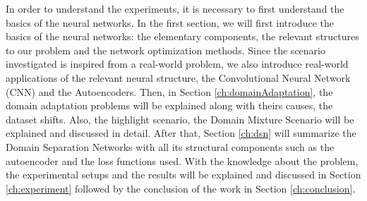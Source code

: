 In order to understand the experiments, it is necessary to first understand the basics of the neural networks. In the first section, we will first introduce the basics of the neural networks: the elementary components, the relevant structures to our problem and the network optimization methods. Since the scenario investigated is inspired from a real-world problem, we also introduce real-world applications of the relevant neural structure, the Convolutional Neural Network (CNN) and the Autoencoders. Then, in Section \ref{ch:domainAdaptation}, the domain adaptation problems will be explained along with theirs causes, the dataset shifts. Also, the highlight scenario, the Domain Mixture Scenario will be explained and discussed in detail. After that, Section \ref{ch:dsn} will summarize the Domain Separation Networks with all its structural components such as the autoencoder and the loss functions used. With the knowledge about the problem, the experimental setups and the results will be explained and discussed in Section \ref{ch:experiment} followed by the conclusion of the work in Section \ref{ch:conclusion}.


